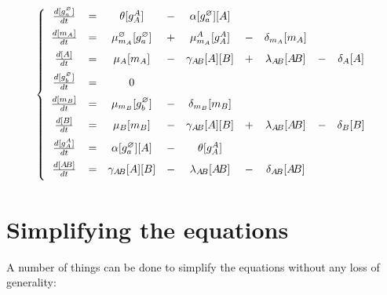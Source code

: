 \documentclass[12pt]{article}
\newcommand{\p}{\vspace{5 mm}\noindent}
\begin{document}
\begin{eqnarray}
\left\{ 
\begin{array}{ccccccccc}
\vspace{2mm}
\frac{d[g_a^\varnothing]}{dt}&=&\theta [g_A^A]                         &-&\alpha [g_a^\varnothing] [A]                      \\
\vspace{2mm}
\frac{d[m_A]}{dt}            &=&\mu_{m_A}^\varnothing [g_a^\varnothing]&+&\mu_{m_A}^A [g_A^{A}]  &-& \delta_{m_A} [m_A]     \\
\vspace{2mm}
\frac{d[A]}{dt}              &=&\mu_{A} [m_A]           &-&\gamma_{A\! B} [A][B] &+& \lambda_{A\! B} [A\! B] &-& \delta_A [A]\\
\vspace{2mm}
\frac{d[g_b^\varnothing]}{dt}&=&0                                                                                           \\
\vspace{2mm}
\frac{d[m_B]}{dt}            &=&\mu_{m_B} [g_b^\varnothing]            &-&\delta_{m_B} [m_B]                                \\
\vspace{2mm}
\frac{d[B]}{dt}              &=&\mu_{B} [m_B]          &-&\gamma_{A\! B} [A][B] &+& \lambda_{A\! B} [A\! B] &-& \delta_B [B]\\
\vspace{2mm}
\frac{d[g_A^A]}{dt}          &=&\alpha [g_a^\varnothing] [A]           &-&\theta [g_A^A]                                    \\
\vspace{2mm}
\frac{d[A\! B]}{dt}          &=&\gamma_{A\! B} [A][B]                 &-& \lambda_{A\! B} [A\! B] &-& \delta_{A\! B} [A\! B]
\end{array}
\right.
\end{eqnarray}

\section{Simplifying the equations}

\p A number of things can be done to simplify the equations without any loss of generality:
\end{document}
